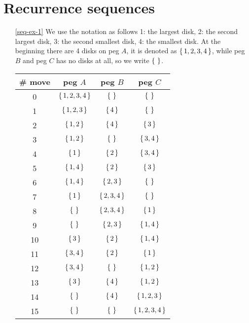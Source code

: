 \newpage
\section{Recurrence sequences}
\begin{enumerate}
\item[\ref{seq-ex-1}]
We use the notation as follows
1: the largest disk, 2: the second largest disk, 3: the second smallest disk, 4: the smallest disk.
At the beginning there are 4 disks on peg $A$, it is denoted as $\left\{\,1,2,3,4\,\right\}$, while peg $B$ and peg $C$
has no disks at all, so we write $\left\{\,\,\right\}$.
\begin{center}
\begin{tabular}{|c|c|c|c|}
\hline
\# move & peg $A$ & peg $B$ & peg $C$\\
\hline
0 & $\left\{\, 1, 2, 3, 4 \,\right\}$ & $\left\{\,\,\right\}$ & $\left\{\,\,\right\}$\\
\hline
1 & $\left\{\, 1, 2, 3 \,\right\}$ & $\left\{\, 4 \,\right\}$ & $\left\{\,\,\right\}$\\
\hline
2 & $\left\{\, 1, 2 \,\right\}$ & $\left\{\, 4 \,\right\}$ & $\left\{\, 3 \,\right\}$\\
\hline
3 & $\left\{\, 1, 2 \,\right\}$ & $\left\{\,\,\right\}$ & $\left\{\, 3, 4 \,\right\}$\\
\hline
4 & $\left\{\, 1 \,\right\}$ & $\left\{\, 2 \,\right\}$ & $\left\{\, 3, 4 \,\right\}$\\
\hline
5 & $\left\{\, 1, 4 \,\right\}$ & $\left\{\, 2 \,\right\}$ & $\left\{\, 3 \,\right\}$\\
\hline
6 & $\left\{\, 1, 4 \,\right\}$ & $\left\{\, 2, 3 \,\right\}$ & $\left\{\,\,\right\}$\\
\hline
7 & $\left\{\, 1 \,\right\}$ & $\left\{\, 2, 3, 4 \,\right\}$ & $\left\{\,\,\right\}$\\
\hline
8 & $\left\{\,\,\right\}$ & $\left\{\, 2, 3, 4 \,\right\}$ & $\left\{\, 1 \,\right\}$\\
\hline
9 & $\left\{\,\,\right\}$ & $\left\{\, 2, 3 \,\right\}$ & $\left\{\, 1, 4 \,\right\}$\\
\hline
10 & $\left\{\, 3 \,\right\}$ & $\left\{\, 2 \,\right\}$ & $\left\{\, 1, 4 \,\right\}$\\
\hline
11 & $\left\{\, 3, 4 \,\right\}$ & $\left\{\, 2 \,\right\}$ & $\left\{\, 1 \,\right\}$\\
\hline
12 & $\left\{\, 3, 4 \,\right\}$ & $\left\{\, \,\right\}$ & $\left\{\, 1, 2 \,\right\}$\\
\hline
13 & $\left\{\, 3 \,\right\}$ & $\left\{\, 4 \,\right\}$ & $\left\{\, 1, 2 \,\right\}$\\
\hline
14 & $\left\{\, \,\right\}$ & $\left\{\, 4 \,\right\}$ & $\left\{\, 1, 2, 3 \,\right\}$\\
\hline
15 & $\left\{\, \,\right\}$ & $\left\{\, \,\right\}$ & $\left\{\, 1, 2, 3, 4 \,\right\}$\\
\hline
\end{tabular}
\end{center}


\end{enumerate}
